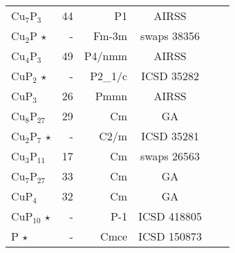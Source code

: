 \begin{tabular}{l r r c l l}
Cu$_\mathrm{7}$P$_\mathrm{3}$             &          44          &          P1          &             AIRSS              &                                \\
       Cu$_\mathrm{2}$P         $\star$   &          -           &       Fm-3m         &          swaps 38356           &                                \\
Cu$_\mathrm{4}$P$_\mathrm{3}$             &          49          &        P4/nmm        &             AIRSS              &                                \\
       CuP$_\mathrm{2}$         $\star$   &          -           &       P2_1/c        &           ICSD 35282           &                                \\
       CuP$_\mathrm{3}$                   &          26          &         Pmmn         &             AIRSS              &                                \\
Cu$_\mathrm{8}$P$_\mathrm{27}$            &          29          &          Cm          &               GA               &                                \\
Cu$_\mathrm{2}$P$_\mathrm{7}$   $\star$   &          -           &        C2/m         &           ICSD 35281           &                                \\
Cu$_\mathrm{3}$P$_\mathrm{11}$            &          17          &          Cm          &          swaps 26563           &                                \\
Cu$_\mathrm{7}$P$_\mathrm{27}$            &          33          &          Cm          &               GA               &                                \\
       CuP$_\mathrm{4}$                   &          32          &          Cm          &               GA               &                                \\
      CuP$_\mathrm{10}$         $\star$   &          -           &        P-1          &          ICSD 418805           &                                \\
              P                 $\star$   &          -           &        Cmce         &          ICSD 150873           &                                \\\end{tabular}